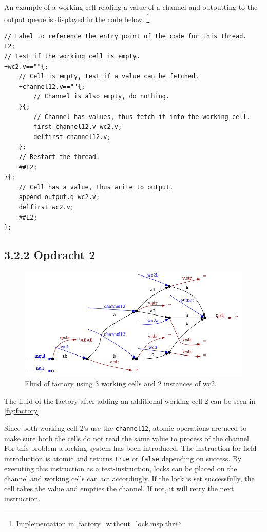 \documentclass[a4paper,12px]{article}
\begin{document}
An example of a working cell reading a value of a channel and outputting to the
output queue is displayed in the code below. \footnote{Implementation in:
factory\_without\_lock.msp.thr}

\begin{verbatim}
// Label to reference the entry point of the code for this thread.
L2;
// Test if the working cell is empty.
+wc2.v==""{;
    // Cell is empty, test if a value can be fetched.
    +channel12.v==""{;
        // Channel is also empty, do nothing.
    }{;
        // Channel has values, thus fetch it into the working cell.
        first channel12.v wc2.v;
        delfirst channel12.v;
    };
    // Restart the thread.
    ##L2;
}{;
    // Cell has a value, thus write to output.
    append output.q wc2.v;
    delfirst wc2.v;
    ##L2;
};
\end{verbatim}

\subsection{3.2.2 Opdracht 2}

\begin{figure}[h]
    \centering
    \includegraphics[width=\linewidth]{factory.png}
    \caption{Fluid of factory using 3 working cells and 2 instances of wc2.}
    \label{fig:factory}
\end{figure}
\FloatBarrier%
The fluid of the factory after adding an additional working cell 2 can be seen in \autoref{fig:factory}.

Since both working cell 2's use the \verb|channel12|, atomic operations are
need to make sure both the cells do not read the same value to process of the
channel. For this problem a locking system has been introduced. The instruction
for field introduction is atomic and returns \verb|true| or \verb|false|
depending on success. By executing this instruction as a test-instruction, locks
can be placed on the channel and working cells can act accordingly. If the lock
is set successfully, the cell takes the value and empties the channel. If not,
it will retry the next instruction.
\end{document}
